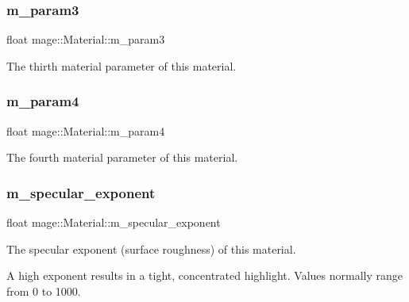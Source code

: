 \subsubsection{\texorpdfstring{m\+\_\+param3}{m\_param3}}
{\footnotesize\ttfamily float mage\+::\+Material\+::m\+\_\+param3\hspace{0.3cm}{\ttfamily [private]}}

The thirth material parameter of this material. \hypertarget{structmage_1_1_material_a5bdd53b39894a2f04cf68b03906ab149}{}\label{structmage_1_1_material_a5bdd53b39894a2f04cf68b03906ab149} 
\subsubsection{\texorpdfstring{m\+\_\+param4}{m\_param4}}
{\footnotesize\ttfamily float mage\+::\+Material\+::m\+\_\+param4\hspace{0.3cm}{\ttfamily [private]}}

The fourth material parameter of this material. \hypertarget{structmage_1_1_material_a62a9e8d9f90bf569b9f692c28da6a7dc}{}\label{structmage_1_1_material_a62a9e8d9f90bf569b9f692c28da6a7dc} 
\subsubsection{\texorpdfstring{m\+\_\+specular\+\_\+exponent}{m\_specular\_exponent}}
{\footnotesize\ttfamily float mage\+::\+Material\+::m\+\_\+specular\+\_\+exponent\hspace{0.3cm}{\ttfamily [private]}}

The specular exponent (surface roughness) of this material.

A high exponent results in a tight, concentrated highlight. Values normally range from 0 to 1000. \hypertarget{structmage_1_1_material_a452a92691f612bd21857525c00c5e8e5}{}\label{structmage_1_1_material_a452a92691f612bd21857525c00c5e8e5} 
